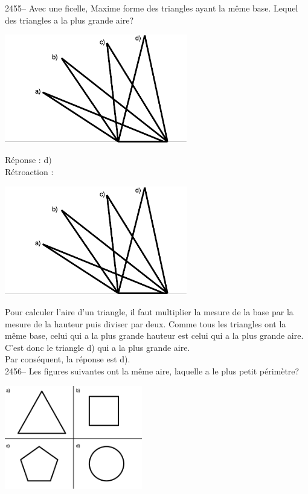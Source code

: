 \documentclass[letterpaper, 12pt]{article}
\begin{document}
2455-- Avec une ficelle, Maxime forme des triangles ayant la m\^eme base. Lequel des triangles a la plus grande aire?\\
\begin{center}
 \includegraphics[width=8cm,bb=0 0 684 512]{Q2455.eps}
\end{center}

R\'eponse : d$)$\\

R\'etroaction :\\
\begin{center}
 \includegraphics[width=8cm,bb=0 0 684 512]{Q2455.eps}
\end{center}
Pour calculer l'aire d'un triangle, il faut multiplier la mesure de la base par la mesure de la hauteur puis diviser par deux. Comme tous les triangles ont la m\^eme base, celui qui a la plus grande hauteur est celui qui a la plus grande aire. C'est donc le triangle d) qui a la plus grande aire. \\
Par cons\'equent, la r\'eponse est d).\\

2456-- Les figures suivantes ont la m\^eme aire, laquelle a le plus petit p\'erim\`etre?\\
\begin{center}
 \includegraphics[width=6cm,bb=0 0 735 555]{Q2456.eps}
\end{center}
\end{document}

